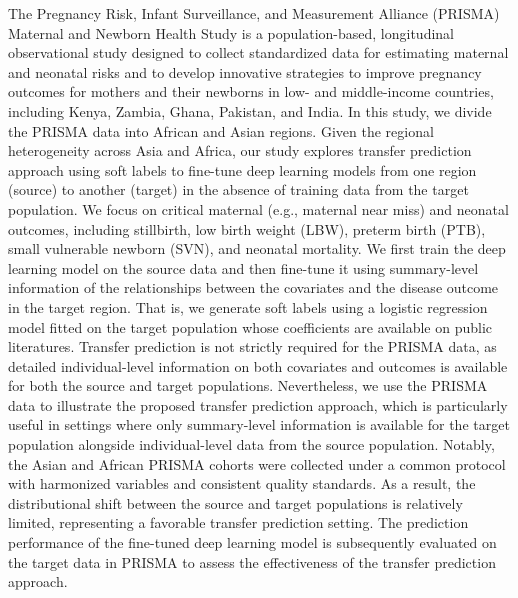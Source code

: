\documentclass[fleqn,10pt]{wlscirep}
\begin{document}
The Pregnancy Risk, Infant Surveillance, and Measurement Alliance (PRISMA) Maternal and Newborn Health Study is a population-based, longitudinal observational study designed to collect standardized data for estimating maternal and neonatal risks and to develop innovative strategies to improve pregnancy outcomes for mothers and their newborns in low- and middle-income countries\cite{peng2024global}, including Kenya, Zambia, Ghana, Pakistan, and India. In this study, we divide the PRISMA data into African and Asian regions. Given the regional heterogeneity across Asia and Africa, our study explores transfer prediction approach using soft labels to fine-tune deep learning models from one region (source) to another (target) in the absence of training data from the target population. We focus on critical maternal (e.g., maternal near miss) and neonatal outcomes, including stillbirth, low birth weight (LBW), preterm birth (PTB), small vulnerable newborn (SVN), and neonatal mortality\cite{islam2022machine,mangold2021machine}. We first train the deep learning model on the source data and then fine-tune it using summary-level information of the relationships between the covariates and the disease outcome in the target region. That is, we generate soft labels using a logistic regression model fitted on the target population whose coefficients are available on public literatures. Transfer prediction is not strictly required for the PRISMA data, as detailed individual-level information on both covariates and outcomes is available for both the source and target populations. Nevertheless, we use the PRISMA data to illustrate the proposed transfer prediction approach, which is particularly useful in settings where only summary-level information is available for the target population alongside individual-level data from the source population. Notably, the Asian and African PRISMA cohorts were collected under a common protocol with harmonized variables and consistent quality standards. As a result, the distributional shift between the source and target populations is relatively limited, representing a favorable transfer prediction setting. The prediction performance of the fine-tuned deep learning model is subsequently evaluated on the target data in PRISMA to assess the effectiveness of the transfer prediction approach. 
\end{document}

